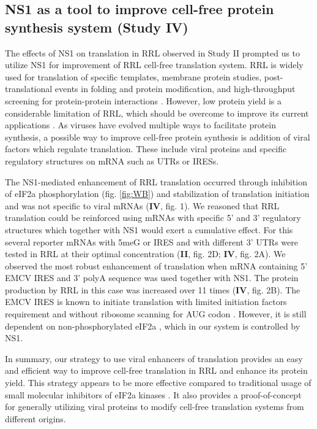 	
	\subsection{NS1 as a tool to improve cell-free protein synthesis system (Study IV)}
	
		The effects of NS1 on translation in \gls{RRL} observed in Study II prompted us to utilize NS1 for improvement of \gls{RRL} cell-free translation system. \gls{RRL} is widely used for translation of specific templates, membrane protein studies, post-translational events in folding and protein modification, and high-throughput screening for protein-protein interactions \parencite{Fuller2000, Douthwaite2012, Fixsen2010, Wang2011}. However, low protein yield is a considerable limitation of RRL, which should be overcome to improve its current applications \parencite{Carlson2012}. As viruses have evolved multiple ways to facilitate protein synthesis, a possible way to improve cell-free protein synthesis is addition of viral factors which regulate translation. These include viral proteins and specific regulatory structures on mRNA such as \gls{UTR}s or \glspl{IRES}. 
	
		The NS1-mediated enhancement of \gls{RRL} translation occurred through inhibition of \gls{eIF2a} phosphorylation (fig. \ref{fig:WB}) and stabilization of translation initiation and was not specific to viral mRNAs (\textbf{IV}, fig. 1). We reasoned that \gls{RRL} translation could be reinforced using mRNAs with specific 5' and 3' regulatory structures which together with \gls{NS1} would exert a cumulative effect. For this several reporter mRNAs with \gls{5meG} or \gls{IRES} and with different 3' \gls{UTR}s were tested in RRL at their optimal concentration (\textbf{II}, fig. 2D; \textbf{IV}, fig. 2A). We observed the most robust enhancement of translation when mRNA containing 5' \gls{EMCV} \gls{IRES} and 3' \gls{polyA} sequence was used together with NS1. The protein production by RRL in this case was increased over 11 times (\textbf{IV}, fig. 2B). The \gls{EMCV} \gls{IRES} is known to initiate translation with limited initiation factors requirement and without ribosome scanning for AUG codon \parencite{Pestova2001}. However, it is still dependent on non-phosphorylated \gls{eIF2a} \parencite{Terenin2008}, which in our system is controlled by NS1. 
	
		In summary, our strategy to use viral enhancers of translation provides an easy and efficient way to improve cell-free translation in \gls{RRL} and enhance its protein yield. This strategy appears to be more effective compared to traditional usage of small molecular inhibitors of \gls{eIF2a} kinases \parencite{Jammi2003}. It also provides a proof-of-concept for generally utilizing viral proteins to modify cell-free translation systems from different origins.
	
